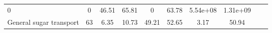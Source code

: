 \documentclass[]{article}
\begin{document}
\begin{longtable}[]{@{}lccccccccc@{}}
\begin{minipage}[t]{0.08\columnwidth}
0\strut
\end{minipage} & \begin{minipage}[t]{0.08\columnwidth}\centering\strut
0\strut
\end{minipage} & \begin{minipage}[t]{0.08\columnwidth}\centering\strut
46.51\strut
\end{minipage} & \begin{minipage}[t]{0.08\columnwidth}\centering\strut
65.81\strut
\end{minipage} & \begin{minipage}[t]{0.08\columnwidth}\centering\strut
0\strut
\end{minipage} & \begin{minipage}[t]{0.08\columnwidth}\centering\strut
63.78\strut
\end{minipage} & \begin{minipage}[t]{0.08\columnwidth}\centering\strut
5.54e+08\strut
\end{minipage} & \begin{minipage}[t]{0.08\columnwidth}\centering\strut
1.31e+09\strut
\end{minipage}\tabularnewline
\begin{minipage}[t]{0.07\columnwidth}\raggedright\strut
General sugar transport\strut
\end{minipage} & \begin{minipage}[t]{0.06\columnwidth}\centering\strut
63\strut
\end{minipage} & \begin{minipage}[t]{0.08\columnwidth}\centering\strut
6.35\strut
\end{minipage} & \begin{minipage}[t]{0.08\columnwidth}\centering\strut
10.73\strut
\end{minipage} & \begin{minipage}[t]{0.08\columnwidth}\centering\strut
49.21\strut
\end{minipage} & \begin{minipage}[t]{0.08\columnwidth}\centering\strut
52.65\strut
\end{minipage} & \begin{minipage}[t]{0.08\columnwidth}\centering\strut
3.17\strut
\end{minipage} & \begin{minipage}[t]{0.08\columnwidth}\centering\strut
50.94\strut
\end{minipage} & \begin{minipage}[t]{0.08\columnwidth}\centering\strut

\end{minipage}
\end{longtable}
\end{document}
